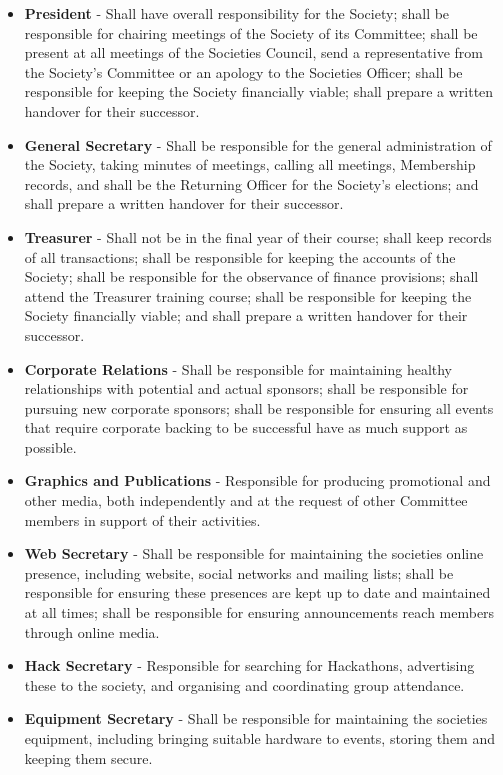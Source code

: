 \documentclass[a4paper,twoside,notitlepage,11pt]{article}
\begin{document}
\begin{itemize}
	\item \textbf{President} - Shall have overall responsibility for the Society; shall be responsible for chairing meetings of the Society of its Committee; shall be present at all meetings of the Societies Council, send a representative from the Society's Committee or an apology to the Societies Officer; shall be responsible for keeping the Society financially viable; shall prepare a written handover for their successor.
	\item \textbf{General Secretary} - Shall be responsible for the general administration of the Society, taking minutes of meetings, calling all meetings, Membership records, and shall be the Returning Officer for the Society's elections; and shall prepare a written handover for their successor. 
	\item \textbf{Treasurer} - Shall not be in the final year of their course; shall keep records of all transactions; shall be responsible for keeping the accounts of the Society; shall be responsible for the observance of finance provisions; shall attend the Treasurer training course; shall be responsible for keeping the Society financially viable; and shall prepare a written handover for their successor.
	\item \textbf{Corporate Relations} - Shall be responsible for maintaining healthy relationships with potential and actual sponsors; shall be responsible for pursuing new corporate sponsors; shall be responsible for ensuring all events that require corporate backing to be successful have as much support as possible.
	\item \textbf{Graphics and Publications} - Responsible for producing promotional and other media, both independently and at the request of other Committee members in support of their activities.
	\item \textbf{Web Secretary} - Shall be responsible for maintaining the societies online presence, including website, social networks and mailing lists; shall be responsible for ensuring these presences are kept up to date and maintained at all times; shall be responsible for ensuring announcements reach members through online media.
	\item \textbf{Hack Secretary} - Responsible for searching for Hackathons, advertising these to the society, and organising and coordinating group attendance.
	\item \textbf{Equipment Secretary} - Shall be responsible for maintaining the societies equipment, including bringing suitable hardware to events, storing them and keeping them secure.
\end{itemize}
\end{document}

